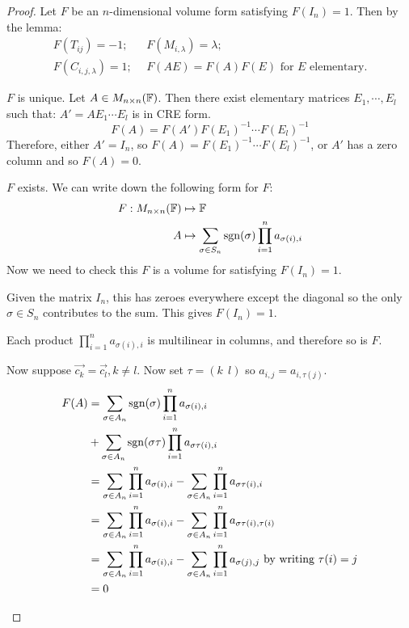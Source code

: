 \documentclass[../Main.tex]{subfiles}
\begin{document}
\begin{proof}
    Let $F$ be an $n$-dimensional volume form satisfying $F(I_n) = 1$. Then by the lemma:
    \begin{align*}
        F(T_{ij}) = -1;~&~F(M_{i, \lambda}) = \lambda;\\
        F(C_{i, j, \lambda}) = 1;~&~F(AE) = F(A)F(E) \text{ for }E\text{ elementary.}
    \end{align*}
    \begin{subproof}{$F$ is unique.}
        Let $A \in M_{n \times n}(\mathbb{F})$. Then there exist elementary matrices $E_1, \cdots, E_l$ such that: $A' = AE_1 \cdots E_l$ is in CRE form.
        \begin{equation*}
            F(A) = F(A') F(E_1)^{-1} \cdots F(E_l)^{-1}
        \end{equation*}
        Therefore, either $A' = I_n$, so $F(A) = F(E_1)^{-1} \cdots F(E_l)^{-1}$, or $A'$ has a zero column and so $F(A) = 0$.
    \end{subproof}
    \begin{subproof}{$F$ exists.}
        We can write down the following form for $F$:
        \begin{align*}
            F : M_{n \times n}(\mathbb{F}) &\mapsto \mathbb{F}\\
            A &\mapsto \sum_{\sigma \in S_n} \operatorname{sgn}(\sigma) \prod_{i=1}^{n}a_{\sigma(i), i}
        \end{align*}
        Now we need to check this $F$ is a volume for satisfying $F(I_n) = 1$.

        Given the matrix $I_n$, this has zeroes everywhere except the diagonal so the only $\sigma \in S_n$ contributes to the sum. This gives $F(I_n) = 1$.

        Each product $\prod_{i=1}^{n} a_{\sigma(i), i}$ is multilinear in columns, and therefore so is $F$.

        Now suppose $\vec{c_k} = \vec{c_l}, k \neq l$. Now set $\tau = (k~~l)$ so $a_{i,j} = a_{i, \tau(j)}$.
        \begin{align*}
            F(A) &= \sum_{\sigma \in A_n} \operatorname{sgn}(\sigma) \prod_{i=1}^{n} a_{\sigma(i), i} \\
            &+ \sum_{\sigma \in A_n} \operatorname{sgn}(\sigma \tau) \prod_{i=1}^{n} a_{\sigma\tau(i), i} \\
            &= \sum_{\sigma \in A_n} \prod_{i=1}^{n} a_{\sigma(i), i} - \sum_{\sigma \in A_n} \prod_{i=1}^{n} a_{\sigma\tau(i), i} \\
            &= \sum_{\sigma \in A_n} \prod_{i=1}^{n} a_{\sigma(i), i} - \sum_{\sigma \in A_n} \prod_{i=1}^{n} a_{\sigma\tau(i), \tau(i)} \\
            &= \sum_{\sigma \in A_n} \prod_{i=1}^{n} a_{\sigma(i), i} - \sum_{\sigma \in A_n} \prod_{i=1}^{n} a_{\sigma(j), j} \text{ by writing } \tau(i) = j \\
            &= 0
        \end{align*}
    \end{subproof}
\end{proof}
\end{document}
